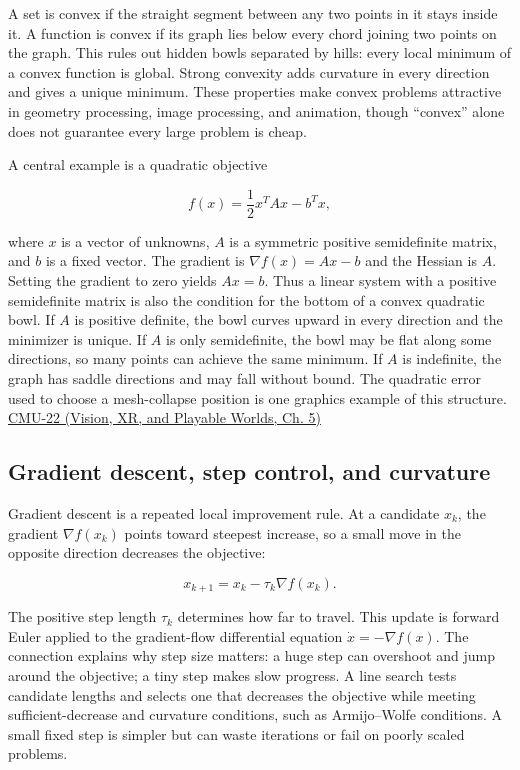 A set is convex if the straight segment between any two points in it stays inside it. A function is convex if its graph lies below every chord joining two points on the graph. This rules out hidden bowls separated by hills: every local minimum of a convex function is global. Strong convexity adds curvature in every direction and gives a unique minimum. These properties make convex problems attractive in geometry processing, image processing, and animation, though ``convex'' alone does not guarantee every large problem is cheap.

A central example is a quadratic objective

\[
f(x)=\frac12 x^T A x-b^T x,
\]

where \(x\) is a vector of unknowns, \(A\) is a symmetric positive semidefinite matrix, and \(b\) is a fixed vector. The gradient is \(\nabla f(x)=Ax-b\) and the Hessian is \(A\). Setting the gradient to zero yields \(Ax=b\). Thus a linear system with a positive semidefinite matrix is also the condition for the bottom of a convex quadratic bowl. If \(A\) is positive definite, the bowl curves upward in every direction and the minimizer is unique. If \(A\) is only semidefinite, the bowl may be flat along some directions, so many points can achieve the same minimum. If \(A\) is indefinite, the graph has saddle directions and may fall without bound. The quadratic error used to choose a mesh-collapse position is one graphics example of this structure. \href{../07-Vision-XR-and-Playable-Worlds/main.pdf\#nameddest=04-visual-computing-ii-ch036-cmu-22---optimization}{CMU-22 (Vision, XR, and Playable Worlds, Ch. 5)}

\subsection{Gradient descent, step control, and curvature}\label{04-visual-computing-ii-ch029-gradient-descent-step-control-and-curvature}

Gradient descent is a repeated local improvement rule. At a candidate \(x_k\), the gradient \(\nabla f(x_k)\) points toward steepest increase, so a small move in the opposite direction decreases the objective:

\[
x_{k+1}=x_k-\tau_k\nabla f(x_k).
\]

The positive step length \(\tau_k\) determines how far to travel. This update is forward Euler applied to the gradient-flow differential equation \(\dot x=-\nabla f(x)\). The connection explains why step size matters: a huge step can overshoot and jump around the objective; a tiny step makes slow progress. A line search tests candidate lengths and selects one that decreases the objective while meeting sufficient-decrease and curvature conditions, such as Armijo--Wolfe conditions. A small fixed step is simpler but can waste iterations or fail on poorly scaled problems.


